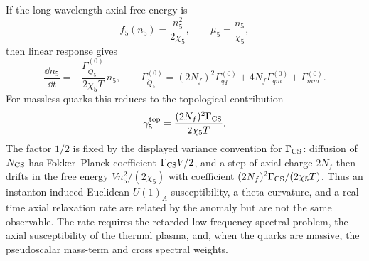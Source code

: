 \begin{controlledapproximation}
If the long-wavelength axial free energy is
\[
  f_5(n_5)=\frac{n_5^2}{2\chi_5},\qquad
  \mu_5=\frac{n_5}{\chi_5},
\]
then linear response gives
\begin{equation}
  \frac{\dd n_5}{\dd t}
  =
  -
  \frac{\Gamma_{\dot Q_5}^{(0)}}{2\chi_5T}\,n_5,
  \qquad
  \Gamma_{\dot Q_5}^{(0)}
  =
  (2N_f)^2\Gamma_{qq}^{(0)}
  +
  4N_f\Gamma_{qm}^{(0)}
  +
  \Gamma_{mm}^{(0)} .
  \label{eq:qcd-axial-charge-relaxation-rate}
\end{equation}
For massless quarks this reduces to the topological contribution
\begin{equation}
  \gamma_5^{\rm top}
  =
  \frac{(2N_f)^2\Gamma_{\rm CS}}{2\chi_5T}.
  \label{eq:qcd-massless-topological-axial-relaxation}
\end{equation}
The factor \(1/2\) is fixed by the displayed variance convention for
\(\Gamma_{\rm CS}\): diffusion of \(N_{\rm CS}\) has Fokker--Planck
coefficient \(\Gamma_{\rm CS}V/2\), and a step of axial charge
\(2N_f\) then drifts in the free energy \(Vn_5^2/(2\chi_5)\) with coefficient
\((2N_f)^2\Gamma_{\rm CS}/(2\chi_5T)\).
Thus an instanton-induced Euclidean \(U(1)_A\) susceptibility, a theta
curvature, and a real-time axial relaxation rate are related by the anomaly
but are not the same observable.  The rate requires the retarded low-frequency
spectral problem, the axial susceptibility of the thermal plasma, and, when
the quarks are massive, the pseudoscalar mass-term and cross spectral weights.
\end{controlledapproximation}

